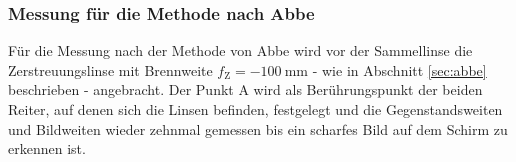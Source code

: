 \subsubsection{Messung für die Methode nach Abbe}

Für die Messung nach der Methode von Abbe wird vor der Sammellinse die Zerstreuungslinse mit 
Brennweite $f_{\mathrm{Z}}=-\SI{100}{\milli\meter}$ - wie in Abschnitt \ref{sec:abbe} 
beschrieben - angebracht. Der Punkt A wird als Berührungspunkt der beiden Reiter, auf denen 
sich die Linsen befinden, festgelegt und die Gegenstandsweiten und Bildweiten wieder zehnmal 
gemessen bis ein scharfes Bild auf dem Schirm zu erkennen ist.
